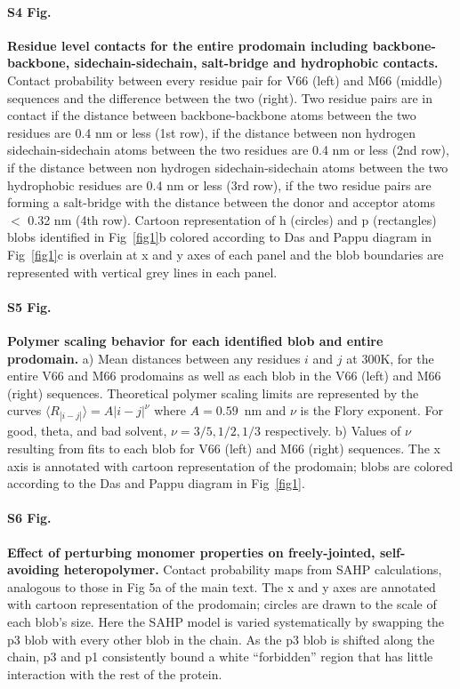 \documentclass[10pt,letterpaper]{article}
\begin{document}
\paragraph*{S4 Fig.}
\label{S4_Fig}
{\bf Residue level contacts for the entire prodomain including backbone-backbone, sidechain-sidechain, salt-bridge and hydrophobic contacts.}
Contact probability between every residue pair for V66 (left) and M66 (middle) sequences and the difference between the two (right). Two residue pairs are in contact if the distance between backbone-backbone atoms between the two residues are 0.4 nm or less (1st row), if the distance between non hydrogen sidechain-sidechain atoms between the two residues are 0.4 nm or less (2nd row), if the distance between non hydrogen sidechain-sidechain atoms between the two hydrophobic residues are 0.4 nm or less (3rd row), if the two residue pairs are forming a salt-bridge with the distance between the donor and acceptor atoms $<$ 0.32 nm (4th row). Cartoon representation of h (circles) and p (rectangles) blobs identified in Fig~\ref{fig1}b colored according to Das and Pappu diagram in Fig~\ref{fig1}c is overlain at x and y axes of each panel and the blob boundaries are represented with vertical grey lines in each panel.

\paragraph*{S5 Fig.}
\label{S5_Fig}
{\bf Polymer scaling behavior for each identified blob and entire prodomain.} 
a) Mean distances between any residues $i$ and $j$ at 300K, for the entire V66 and M66 prodomains as well as each blob in the V66 (left) and M66 (right) sequences. Theoretical polymer scaling limits are represented by the curves $\langle R_{|i-j|}\rangle = A |i-j|^{\nu}$ where $A=0.59$~nm and $\nu$ is the Flory exponent. For good, theta, and bad solvent, $\nu = 3/5, 1/2, 1/3$ respectively. b) Values of $\nu$ resulting from fits to each blob for V66 (left) and M66 (right) sequences. The x axis is annotated with cartoon representation of the prodomain; blobs are colored according to the Das and Pappu diagram in Fig~\ref{fig1}.

\paragraph*{S6 Fig.}
\label{S6_Fig}
{\bf Effect of perturbing monomer properties on freely-jointed, self-avoiding heteropolymer.}
Contact probability maps from SAHP calculations, analogous to those in Fig 5a of the main text. The x and y axes are annotated with cartoon representation of the prodomain; circles are drawn to the scale of each blob's size. Here the SAHP model is varied systematically by swapping the p3 blob with every other blob in the chain. As the p3 blob is shifted along the chain, p3 and p1 consistently bound a white ``forbidden'' region that has little interaction with the rest of the protein.
\end{document}
